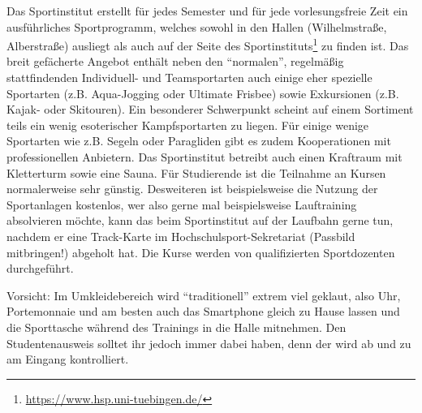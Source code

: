 
Das Sportinstitut erstellt für jedes Semester und für jede
  vorlesungsfreie Zeit ein ausführliches Sportprogramm, welches sowohl in
  den Hallen (Wilhelmstraße, Alberstraße) ausliegt als auch auf der
  Seite des Sportinstituts\footnote{
  \url{https://www.hsp.uni-tuebingen.de/}}
  zu finden ist. Das breit gefächerte Angebot enthält neben den "`normalen"', regelmäßig stattfindenden Individuell- und Teamsportarten auch einige eher spezielle Sportarten (z.B. Aqua-Jogging oder Ultimate Frisbee) sowie Exkursionen (z.B. Kajak- oder Skitouren). Ein besonderer Schwerpunkt scheint auf einem Sortiment teils ein wenig esoterischer Kampfsportarten zu liegen. Für einige wenige Sportarten wie z.B. Segeln oder Paragliden gibt es zudem Kooperationen mit professionellen Anbietern. Das Sportinstitut betreibt auch einen Kraftraum mit Kletterturm sowie eine Sauna. Für Studierende ist
  die Teilnahme an Kursen normalerweise sehr günstig. 
  Desweiteren ist beispielsweise die Nutzung der Sportanlagen kostenlos, wer also gerne mal beispielsweise Lauftraining absolvieren möchte, kann das beim Sportinstitut auf der Laufbahn gerne tun, nachdem er eine Track-Karte im Hochschulsport-Sekretariat (Passbild mitbringen!) abgeholt hat.
  Die Kurse werden von qualifizierten Sportdozenten durch\-ge\-führt.\medskip

Vorsicht: Im Umkleidebereich wird "`traditionell"' extrem viel
  geklaut, also Uhr, Portemonnaie und am besten auch das Smartphone gleich
  zu Hause lassen und die Sporttasche wäh\-rend des Trainings in
  die Halle mitnehmen. Den Studentenausweis solltet ihr jedoch immer dabei haben, denn der wird
  ab und zu am Eingang kontrolliert.
